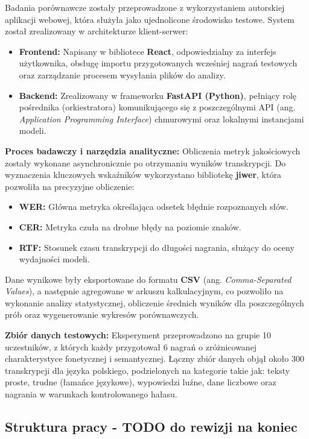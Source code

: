 Badania porównawcze zostały przeprowadzone z wykorzystaniem autorskiej aplikacji webowej, która służyła jako ujednolicone środowisko testowe. System został zrealizowany w architekturze klient-serwer:
\begin{itemize}
\item \textbf{Frontend:} Napisany w bibliotece \textbf{React}, odpowiedzialny za interfejs użytkownika, obsługę importu przygotowanych wcześniej nagrań testowych oraz zarządzanie procesem wysyłania plików do analizy.
\item \textbf{Backend:} Zrealizowany w frameworku \textbf{FastAPI (Python)}, pełniący rolę pośrednika (orkiestratora) komunikującego się z poszczególnymi API (ang. \textit{Application Programming Interface}) chmurowymi oraz lokalnymi instancjami modeli.
\end{itemize}
\textbf{Proces badawczy i narzędzia analityczne:} Obliczenia metryk jakościowych zostały wykonane asynchronicznie po otrzymaniu wyników transkrypcji. Do wyznaczenia kluczowych wskaźników wykorzystano bibliotekę \textbf{jiwer}, która pozwoliła na precyzyjne obliczenie:
\begin{itemize}
\item \textbf{WER:} Główna metryka określająca odsetek błędnie rozpoznanych słów.
\item \textbf{CER:} Metryka czuła na drobne błędy na poziomie znaków.
\item \textbf{RTF:} Stosunek czasu transkrypcji do długości nagrania, służący do oceny wydajności modeli.
\end{itemize}
Dane wynikowe były eksportowane do formatu \textbf{CSV} (ang. \textit{Comma-Separated Values}), a następnie agregowane w arkuszu kalkulacyjnym, co pozwoliło na wykonanie analizy statystycznej, obliczenie średnich wyników dla poszczególnych prób oraz wygenerowanie wykresów porównawczych.

\textbf{Zbiór danych testowych:} Eksperyment przeprowadzono na grupie 10 uczestników, z których każdy przygotował 6 nagrań o zróżnicowanej charakterystyce fonetycznej i semantycznej. Łączny zbiór danych objął około 300 transkrypcji dla języka polskiego, podzielonych na kategorie takie jak: teksty proste, trudne (łamańce językowe), wypowiedzi luźne, dane liczbowe oraz nagrania w warunkach kontrolowanego hałasu.

\subsection*{Struktura pracy - TODO do rewizji na koniec}

